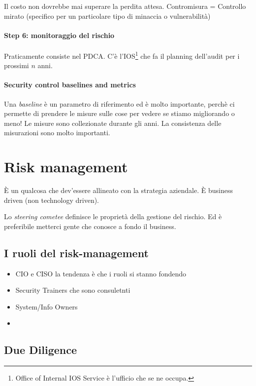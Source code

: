 Il costo non dovrebbe mai superare la perdita attesa.
Contromisura = Controllo mirato (specifico per un particolare tipo di minaccia o
vulnerabilità)

\paragraph*{Step 6: monitoraggio del rischio}

Praticamente consiste nel PDCA.
C'è l'IOS\footnote{Office of Internal IOS Service è l'ufficio che se ne occupa.}
che fa il planning dell'audit per i prossimi $n$ anni.




\paragraph*{Security control baselines and metrics}

Una \textit{baseline} è un parametro di riferimento ed è molto importante,
perchè ci permette di prendere le misure sulle cose per vedere se stiamo
migliorando o meno!
Le misure sono collezionate durante gli anni. La consistenza delle misurazioni
sono molto importanti.

\section{Risk management}
È un qualcosa che dev'essere allineato con la strategia aziendale.
È business driven (non technology driven).


Lo \textit{steering cometee} definisce le proprietà della gestione del rischio.
Ed è preferibile metterci gente che conosce a fondo il business.

\subsection{I ruoli del risk-management}
\begin{itemize}
\item CIO e CISO la tendenza è che i ruoli si stanno fondendo
\item Security Trainers che sono consuletnti
\item System/Info Owners
\item {}
\end{itemize}

\subsection{Due Diligence}

